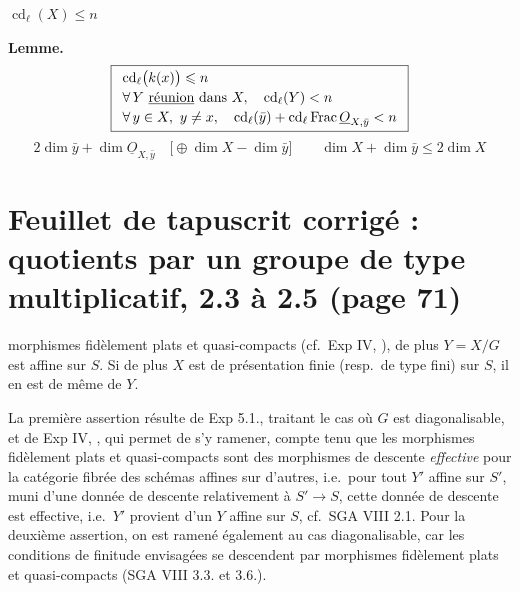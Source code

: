 \documentclass[11pt,a4paper]{article}
\begin{document}

$\operatorname{cd}_{\ell}(X) \leqslant n$

\textbf{Lemme.}
\[
\boxed{
\begin{array}{l}
\operatorname{cd}_{\ell}\bigl(k(x)\bigr) \leqslant n \\[2pt]
\forall\, Y \ \uncertain{\text{réunion}} \text{ dans } X, \quad
\operatorname{cd}_{\ell}(Y) < n \\[2pt]
\forall\, y \in X,\ y \ne x, \quad
\operatorname{cd}_{\ell}(\bar{y}) + \operatorname{cd}_{\ell}
\operatorname{Frac} \underline{O}_{X,\bar y} < n
\end{array}}
\]
\[
2 \dim \bar{y} + \dim \underline{O}_{X,\bar y} \quad
\bigl[\oplus \dim X - \dim \bar{y}\bigr] \qquad
\dim X + \dim \bar{y} \leqslant 2 \dim X
\]

\section*{Feuillet de tapuscrit corrigé : quotients par un groupe de type multiplicatif, 2.3 à 2.5 (page 71)}

morphismes fidèlement plats et quasi-compacts (cf.\ Exp IV, ), de
plus $Y = X/G$ est affine sur $S$. Si de plus $X$ est de présentation finie
(resp.\ de type fini) sur $S$, il en est de même de $Y$.

La première assertion résulte de Exp  5.1.,  traitant
le cas où $G$ est diagonalisable, et de Exp IV, , qui permet de
s'y ramener, compte tenu que les morphismes fidèlement plats et
quasi-compacts  sont des morphismes de descente
\emph{effective} pour la catégorie fibrée des schémas affines sur d'autres,
i.e.\ pour tout $Y'$ affine sur $S'$, muni d'une donnée de descente
relativement à $S' \to S$, cette donnée de descente est effective, i.e.\ $Y'$
provient d'un $Y$ affine sur $S$, cf.\ SGA VIII 2.1. Pour la deuxième
assertion, on est ramené également au cas diagonalisable, car les conditions de finitude envisagées se descendent par morphismes
fidèlement plats et quasi-compacts  (SGA VIII 3.3. et 3.6.).
\end{document}
